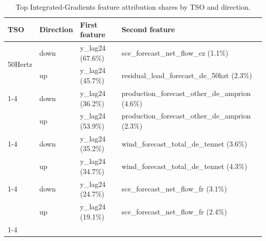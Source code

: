 \begin{table}
\caption{Top Integrated-Gradients feature attribution shares by TSO and direction.}
\begin{tabular}{llll}
\toprule
TSO & Direction & First feature & Second feature \\
\midrule
\multirow[t]{2}{*}{50Hertz} & down & y\_lag24 (67.6\%) & sce\_forecast\_net\_flow\_cz (1.1\%) \\
 & up & y\_lag24 (45.7\%) & residual\_load\_forecast\_de\_50hzt (2.3\%) \\
\cline{1-4}
\multirow[t]{2}{*}{Amprion} & down & y\_lag24 (36.2\%) & production\_forecast\_other\_de\_amprion (4.6\%) \\
 & up & y\_lag24 (53.9\%) & production\_forecast\_other\_de\_amprion (2.3\%) \\
\cline{1-4}
\multirow[t]{2}{*}{TenneT\_DE} & down & y\_lag24 (35.2\%) & wind\_forecast\_total\_de\_tennet (3.6\%) \\
 & up & y\_lag24 (34.7\%) & wind\_forecast\_total\_de\_tennet (4.3\%) \\
\cline{1-4}
\multirow[t]{2}{*}{TransnetBW} & down & y\_lag24 (24.7\%) & sce\_forecast\_net\_flow\_fr (3.1\%) \\
 & up & y\_lag24 (19.1\%) & sce\_forecast\_net\_flow\_fr (2.4\%) \\
\cline{1-4}
\bottomrule
\end{tabular}
\end{table}
